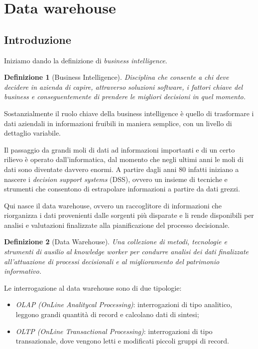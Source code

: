\documentclass[a4paper, 10pt]{article}
\newtheorem{definit}{Definizione}[subsection]
\begin{document}
	\newpage
	\section{Data warehouse}
	\subsection{Introduzione}
	Iniziamo dando la definizione di \textit{business intelligence}.
	
	\begin{definit}[Business Intelligence]
		Disciplina che consente a chi deve decidere in azienda di capire, attraverso soluzioni software, i fattori chiave del business e conseguentemente di prendere le migliori decisioni in quel momento.
	\end{definit}

	Sostanzialmente il ruolo chiave della business intelligence è quello di trasformare i dati aziendali in informazioni fruibili in maniera semplice, con un livello di dettaglio variabile.
	
	Il passaggio da grandi moli di dati ad informazioni importanti e di un certo rilievo è operato dall'informatica, dal momento che negli ultimi anni le moli di dati sono diventate davvero enormi. A partire dagli anni 80 infatti iniziano a nascere i \textit{decision support systems} (DSS), ovvero un insieme di tecniche e strumenti che consentono di estrapolare informazioni a partire da dati grezzi.
	
	Qui nasce il data warehouse, ovvero un raccoglitore di informazioni che riorganizza i dati provenienti dalle sorgenti più disparate e li rende disponibili per analisi e valutazioni finalizzate alla pianificazione del processo decisionale.
	
	\begin{definit}[Data Warehouse]
		Una collezione di metodi, tecnologie e strumenti di ausilio al knowledge worker per condurre analisi dei dati finalizzate all’attuazione di processi decisionali e al miglioramento del patrimonio informativo.
	\end{definit}
	
	Le interrogazione al data warehouse sono di due tipologie:
	\begin{itemize}
		\item \textit{OLAP (OnLine Analitycal Processing)}: interrogazioni di tipo analitico, leggono grandi quantità di record e calcolano dati di sintesi;
		\item \textit{OLTP (OnLine Transactional Processing)}: interrogazioni di tipo transazionale, dove vengono letti e modificati piccoli gruppi di record.
	\end{itemize}
\end{document}
